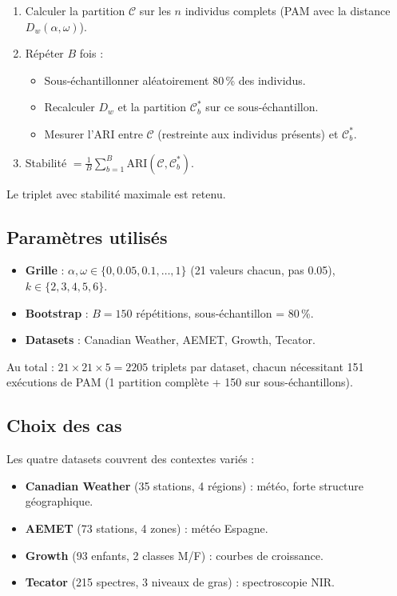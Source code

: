\documentclass[11pt, a4paper]{article}
\newcommand{\Dw}{D_w}
\begin{document}
\begin{enumerate}
  \item Calculer la partition $\mathcal{C}$ sur les $n$ individus complets
        (PAM avec la distance $\Dw(\alpha, \omega)$).
  \item Répéter $B$ fois :
  \begin{itemize}
    \item Sous-échantillonner aléatoirement 80\,\% des individus.
    \item Recalculer $\Dw$ et la partition $\mathcal{C}_b^*$ sur ce
          sous-échantillon.
    \item Mesurer l'ARI entre $\mathcal{C}$ (restreinte aux individus
          présents) et $\mathcal{C}_b^*$.
  \end{itemize}
  \item Stabilité $= \frac{1}{B} \sum_{b=1}^{B} \mathrm{ARI}(\mathcal{C},
        \mathcal{C}_b^*)$.
\end{enumerate}

Le triplet avec stabilité maximale est retenu.

\subsection{Paramètres utilisés}

\begin{itemize}
  \item \textbf{Grille} : $\alpha, \omega \in \{0, 0.05, 0.1, \ldots, 1\}$
        (21 valeurs chacun, pas 0.05), $k \in \{2, 3, 4, 5, 6\}$.
  \item \textbf{Bootstrap} : $B = 150$ répétitions, sous-échantillon =
        80\,\%.
  \item \textbf{Datasets} : Canadian Weather, AEMET, Growth, Tecator.
\end{itemize}

Au total : $21 \times 21 \times 5 = 2205$ triplets par dataset, chacun
nécessitant 151 exécutions de PAM (1 partition complète + 150 sur
sous-échantillons).

\subsection{Choix des cas}

Les quatre datasets couvrent des contextes variés :
\begin{itemize}
  \item \textbf{Canadian Weather} (35 stations, 4 régions) : météo,
        forte structure géographique.
  \item \textbf{AEMET} (73 stations, 4 zones) : météo Espagne.
  \item \textbf{Growth} (93 enfants, 2 classes M/F) : courbes de croissance.
  \item \textbf{Tecator} (215 spectres, 3 niveaux de gras) : spectroscopie
        NIR.
\end{itemize}
\end{document}
